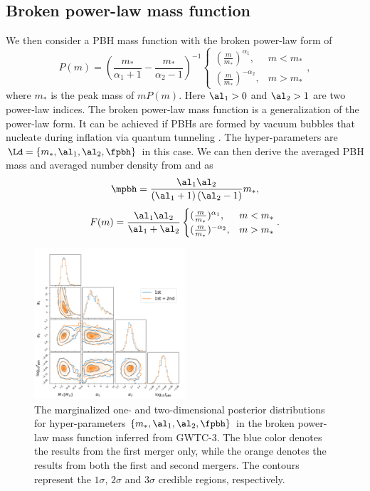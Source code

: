 \documentclass[
reprint,           %
superscriptaddress,%
amsmath,           %
amssymb,           %
aps,               %
prd,               %
notitlepage,       %
longbibliography,  %
floatfix,          %
nofootinbib,
]{revtex4-1}
\def\({\left(}
\def\){\right)}
\def\e{\begin{equation}}
\def\q{\end{equation}}
\begin{document}
\subsection{Broken power-law mass function}
We then consider a PBH mass function with the broken power-law form of \cite{Deng:2021ezy}
\begin{equation}
	P(m)= \left(\frac{m_*}{\alpha_1+1}-\frac{m_*}{\alpha_2-1}\right)^{-1} \begin{cases} (\frac{m}{m_*})^{\alpha_1}, & m<m_* \\ (\frac{m}{m_*})^{-\alpha_2}, & m>m_*\end{cases},
\end{equation}
where $m_*$ is the peak mass of $m P(m)$. Here $\al_1>0$ and $\al_2>1$ are two power-law indices. The broken power-law mass function is a generalization of the power-law form. It can be achieved if PBHs are formed by vacuum bubbles that nucleate during inflation via quantum tunneling \cite{Deng:2021ezy}.
The hyper-parameters are $\Ld = \{m_*, \al_1, \al_2, \fpbh\}$ in this case. 
We can then derive the averaged PBH mass and averaged number density from  and  as
\e
\mpbh = \frac{\al_1 \al_2}{\(\al_1 +1\)\(\al_2 -1\)} m_*,
\q
\e 
F(m) = \frac{\al_1 \al_2}{\al_1 + \al_2} \begin{cases} (\frac{m}{m_*})^{\alpha_1}, & m<m_* \\ (\frac{m}{m_*})^{-\alpha_2}, & m>m_*\end{cases}.
\q

\begin{figure}[tbp!]
	\centering
	\includegraphics[width=0.5\textwidth]{post-bpower.pdf}
	\caption{\label{posterior-bpower}The marginalized one- and two-dimensional posterior distributions for hyper-parameters $\{m_*, \al_1, \al_2, \fpbh\}$ in the broken power-law mass function inferred from GWTC-3. The blue color denotes the results from the first merger only, while the orange denotes the results from both the first and second mergers. The contours represent the $1\sigma$, $2\sigma$ and $3\sigma$ credible regions, respectively.}
\end{figure}
\end{document}
